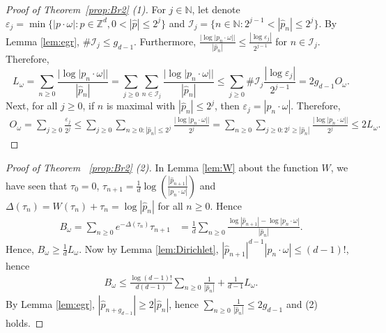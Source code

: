 \documentclass[12pt,reqno,a4paper]{amsart}%
\numberwithin{equation}{section}
\newcommand{\Nn}{{\mathbb{N}}}
\newcommand{\Zz}{{\mathbb{Z}}}
\begin{document}
\begin{proof}[Proof of Theorem~\ref{prop:Br2} (1)]
 For $j\in\Nn$, let denote $\varepsilon_j=\min\{|p\cdot\omega|\colon p\in\Zz^d,0<|\hat p|\leq 2^j\}$ and $\mathcal I_j=\{n\in\Nn\colon 2^{j-1}<|\hat p_n|\leq 2^j\}$. 
 By Lemma \ref{lem:egr}, $\#\mathcal I_j\leq g_{d-1}$. Furthermore, $\frac{|\log|p_n\cdot\omega||}{|\hat p_n|}\leq \frac{|\log\varepsilon_j|}{2^{j-1}}$ for $n\in\mathcal I_j$. Therefore,
 \[
 	L_{\omega}=\sum_{n\geq 0}\frac{|\log|p_n\cdot\omega||}{|\hat p_n|}=\sum_{j\geq 0} \sum_{n\in\mathcal I_j}\frac{|\log|p_n\cdot\omega||}{|\hat p_n|}
 	\leq \sum_{j\geq 0}\#\mathcal I_j\frac{|\log\varepsilon_j|}{2^{j-1}}=2g_{d-1}O_{\omega}.
 	\]
 	Next, for all $j\geq 0$, if $n$ is maximal with $|\hat p_n|\leq 2^j$, then $\varepsilon_j= |p_n\cdot\omega|$. Therefore,
 	\begin{align*}
 		O_{\omega}=\sum_{j\geq 0}\frac{\varepsilon_j}{2^j}\leq \sum_{j\geq 0}\sum_{n\geq 0\colon |\hat p_n|\leq 2^j}\frac{|\log|p_n\cdot\omega||}{2^j}=\sum_{n\geq 0}\sum_{j\geq 0\colon 2^j\geq |\hat p_n|}\frac{|\log|p_n\cdot\omega||}{2^j} \leq 2L_{\omega}.
 	\end{align*}  	
\end{proof}	
\begin{proof}[Proof of Theorem~ \ref{prop:Br2} (2)]
	In Lemma \ref{lem:W} about the function $W$, we have seen that
	 $\tau_0=0$, $\tau_{n+1} = \frac{1}{d} \log \left( \frac{|\hat p_{n+1}|}{|p_{n} \cdot \omega|} \right)$  and  $\Delta(\tau_n)=W(\tau_n)+\tau_n=\log|\hat p_n|$ for all $n\geq 0$. Hence
	\begin{align*}
		B_{\omega}=\sum_{n\geq 0}e^{-\Delta(\tau_n)}\tau_{n+1}&=\frac1d\sum_{n\geq 0}\frac{\log|\hat p_{n+1}|-\log|p_n\cdot\omega|}{|\hat p_n|}.
	\end{align*}
	Hence, $B_{\omega}\geq \tfrac1d L_{\omega}$. 
	Now by Lemma \ref{lem:Dirichlet}, $|\hat p_{n+1}|^{d-1}|p_n\cdot\omega|\leq (d-1)!$, hence
	\begin{align*}
		B_{\omega}\leq \frac{\log(d-1)!}{d(d-1)}\sum_{n\geq 0}\frac1{|\hat p_n|}+\frac1{d-1}L_{\omega}. 
	\end{align*}
	By Lemma \ref{lem:egr}, $|\hat p_{n+g_{d-1}}|\geq 2|\hat p_n|$, hence $\sum_{n\geq 0}\frac1{|\hat p_n|}\leq 2g_{d-1}$ and (2) holds.  
\end{proof}	
\end{document}
